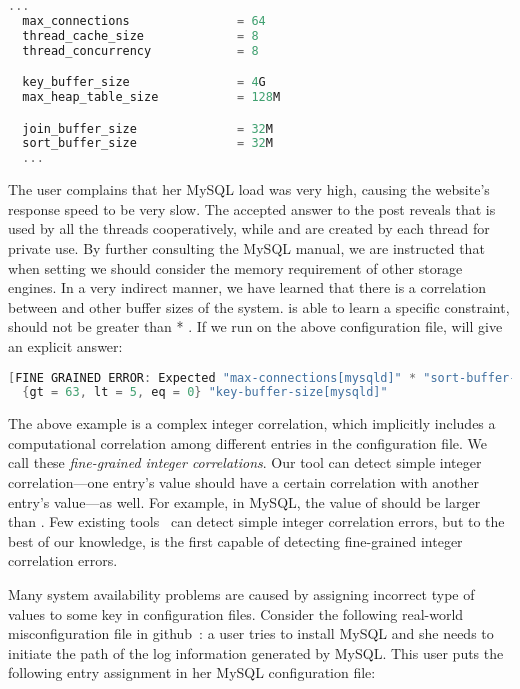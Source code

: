 \begin{lstlisting}[language=C, xleftmargin=.01\textwidth]
  ...
  max_connections               = 64
  thread_cache_size             = 8
  thread_concurrency            = 8

  key_buffer_size               = 4G
  max_heap_table_size           = 128M

  join_buffer_size              = 32M
  sort_buffer_size              = 32M    
  ...
\end{lstlisting} 

The user complains that her MySQL load was very high, 
causing the website's response speed to be very slow.
The accepted answer to the post reveals that  
is used by all the threads cooperatively, 
while  and  are created 
by each thread for private use.
By further consulting the MySQL manual, 
we are instructed that when setting  we should consider the memory requirement of other storage engines.
In a very indirect manner, we have learned that there is a correlation
between  and other buffer sizes of the system.
\app is able to learn a specific constraint, \ie
{} should not be greater than
 * .
If we run \app on the above configuration file, \app will give an explicit answer:

\begin{lstlisting}[language=C, xleftmargin=.01\textwidth]
[FINE GRAINED ERROR: Expected "max-connections[mysqld]" * "sort-buffer-size[mysqld]"
  {gt = 63, lt = 5, eq = 0} "key-buffer-size[mysqld]"
\end{lstlisting} 

The above example is a complex integer correlation, which implicitly
includes a computational correlation among different entries
in the configuration file.
We call these {\em fine-grained integer correlations}. 
Our tool can detect simple integer correlation---one entry's
value should have a certain correlation with another entry's 
value---as well.
For example, in MySQL, the value of  
should be larger than .
Few existing tools~\cite{yin11anempirical, zhang14encore}
can detect simple integer correlation errors,
but to the best of our knowledge, \app is the first capable of
detecting fine-grained integer correlation errors.

Many system availability problems are caused by 
assigning incorrect type of values to some key in configuration
files. Consider the following real-world misconfiguration
file in github~\cite{typeerror}:
a user tries to install MySQL and she needs to initiate the path
of the log information generated by MySQL.
This user puts the following entry assignment in her MySQL
configuration file: 

